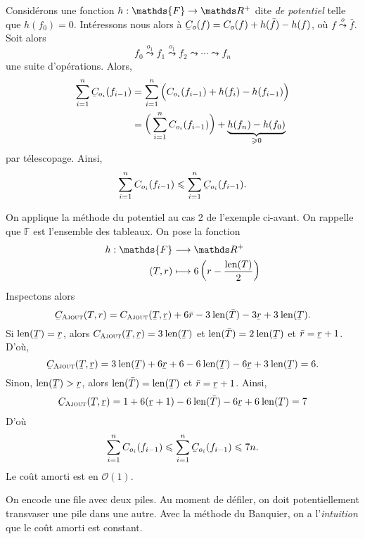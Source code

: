 {{		\begin{met}[du potentiel]
			Considérons une fonction $h : \mathds{F} \to \R^+$\/ dite \textit{de potentiel} telle que $h(f_0) = 0$.
			Intéressons nous alors à $\ubar{C}_o(f) = C_o(f) + h(\bar{f}) - h(f)$, où $f \overset o\leadsto \bar{f}$.
			Soit alors \[
				f_0 \overset{o_1}\leadsto f_1 \overset{o_1}\leadsto f_2 \leadsto \cdots \leadsto f_n
			\]une suite d'opérations. Alors,
			\begin{align*}
				\sum_{i=1}^n \ubar{C}_{o_i}(f_{i-1}) &= \sum_{i=1}^n \Big(C_{o_i}(f_{i-1}) + h(f_i) - h(f_{i-1})\Big)\\
				&= \bigg(\sum_{i=1}^n C_{o_i}(f_{i-1})\bigg) + \underbrace{h(f_n) - h(f_0)}_{\ge  0} \\
			\end{align*}
			par télescopage. Ainsi, \[
				\sum_{i=1}^n C_{o_i}(f_{i-1}) \le \sum_{i=1}^n \ubar{C}_{o_i}(f_{i-1})
			.\]
		\end{met}
	
		\begin{exm}
			On applique la méthode du potentiel au cas 2 de l'exemple ci-avant.
			On rappelle que $\mathds{F}$\/ est l'ensemble des tableaux. On pose la fonction \begin{align*}
				h: \mathds{F} &\longrightarrow \R^+ \\
				(T, r) &\longmapsto 6\left(r - \frac{\mathrm{len}(T)}{2}\right)
			\end{align*}
			Inspectons alors \[
				\ubar{C}_\textsc{Ajout}(T, r) = C_\textsc{Ajout}(\ubar{T}, \ubar{r}) + 6\bar{r} - 3\:\mathrm{len}(\bar{T}) - 3\ubar{r} + 3\:\mathrm{len}(\ubar{T})
			.\]
			Si $\mathrm{len}(\ubar{T}) = \ubar{r}$, alors $C_\textsc{Ajout}(\ubar{T}, \ubar{r}) = 3\:\mathrm{len}(\ubar{T})$\/ et $\mathrm{len}(\bar{T}) = 2\: \mathrm{len}(\ubar{T})$\/ et $\bar{r} = \ubar{r} + 1$.
			D'où, \[
				\ubar{C}_\textsc{Ajout}(\ubar{T}, \ubar{r}) = 3\:\mathrm{len}(\ubar{T}) + 6\ubar{r} + 6 - 6\:\mathrm{len}(\ubar{T}) - 6\ubar{r} + 3\:\mathrm{len}(\ubar{T}) = 6
			.\] 
			Sinon, $\mathrm{len}(\ubar{T}) > \ubar{r}$, alors $\mathrm{len}(\bar{T}) = \mathrm{len}(\ubar{T})$\/ et $\bar{r} = \ubar{r} + 1$.
			Ainsi,
			\begin{align*}
				\ubar{C}_\textsc{Ajout}(\ubar{T}, \ubar{r}) = 1 + 6 (\ubar{r} + 1) - 6\:\mathrm{len}(\bar{T}) - 6 \ubar{r} + 6\:\mathrm{len}(\ubar{T}) = 7
			\end{align*}
			D'où \[
				\sum_{i=1}^n C_{o_i}(f_{i-1}) \le \sum_{i=1}^n \ubar{C}_{o_i}(f_{i-1}) \le 7n
			.\] Le coût amorti est en $\mathcal{O}(1)$.
		\end{exm}
		\begin{exm}
			On encode une file avec deux piles.
			Au moment de défiler, on doit potentiellement transvaser une pile dans une autre.
			Avec la méthode du Banquier, on a l'\textit{intuition} que le coût amorti est constant.
	

\end{exm}}}
